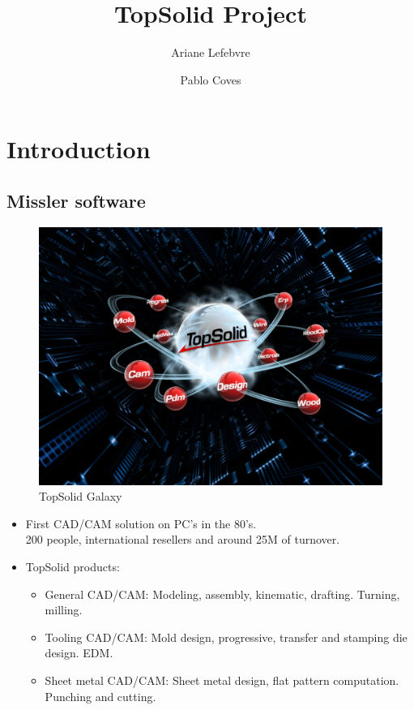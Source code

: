\documentclass{beamer}
\title{TopSolid Project}
\author{Ariane Lefebvre \and Pablo Coves}
\date{}
\begin{document}
\maketitle

\section{Introduction}
\subsection{Missler software}
\begin{frame}
    \begin{figure}
        \includegraphics[width=.8\textwidth]{img/topSolid.jpg}
        \caption{TopSolid Galaxy}
        \label{TopSolid}
    \end{figure}
\end{frame}
\begin{frame}
    \begin{itemize}
        \item First CAD/CAM solution on PC's in the 80's.\\
            200 people, international resellers and around 25M of turnover.
        \item TopSolid products:
            \begin{itemize}
                \item General CAD/CAM:
                    Modeling, assembly, kinematic, drafting.
                    Turning, milling.
                \item Tooling CAD/CAM:
                    Mold design, progressive, transfer and stamping die design. 
                    EDM.
                \item Sheet metal CAD/CAM:
                    Sheet metal design, flat pattern computation. 
                    Punching and cutting.
            \end{itemize}
    \end{itemize}
\end{frame}
\end{document}
